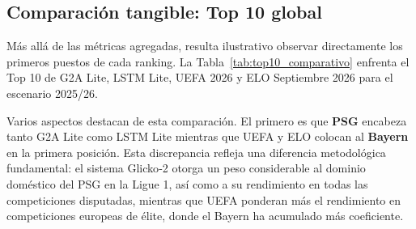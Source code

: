 \subsection{Comparaci\'on tangible: Top 10 global}

M\'as all\'a de las m\'etricas agregadas, resulta ilustrativo observar directamente los primeros puestos de cada ranking. La Tabla~\ref{tab:top10_comparativo} enfrenta el Top 10 de G2A Lite, LSTM Lite, UEFA 2026 y ELO Septiembre 2026 para el escenario 2025/26.

\begin{table}[htbp]
	\centering
	\caption{Top 10 global comparativo — Escenario 2025/26.}
	\label{tab:top10_comparativo}
\end{table}

Varios aspectos destacan de esta comparaci\'on. El primero es que \textbf{PSG} encabeza tanto G2A Lite como LSTM Lite mientras que UEFA y ELO colocan al \textbf{Bayern} en la primera posici\'on. Esta discrepancia refleja una diferencia metodol\'ogica fundamental: el sistema Glicko‑2 otorga un peso considerable al dominio dom\'estico del PSG en la Ligue 1, as\'i como a su rendimiento en todas las competiciones disputadas, mientras que UEFA ponderan m\'as el rendimiento en competiciones europeas de \'elite, donde el Bayern ha acumulado m\'as coeficiente.

